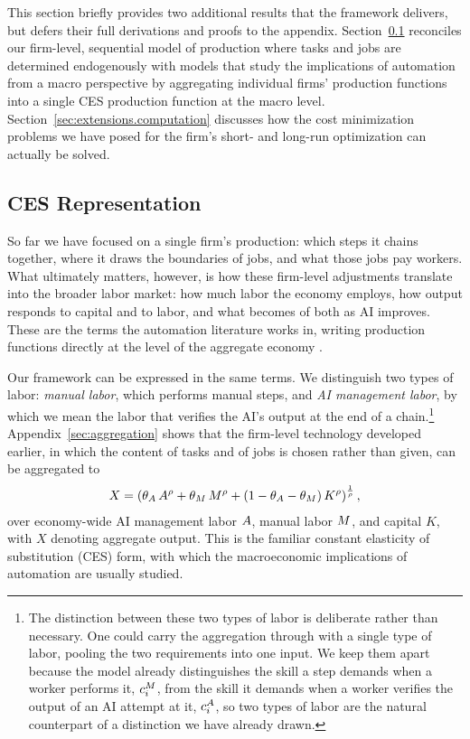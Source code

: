 This section briefly provides two additional results that the framework delivers, but defers their full derivations and proofs to the appendix.
Section~\ref{sec:extensions.aggregation} reconciles our firm-level, sequential model of production where tasks and jobs are determined endogenously with models that study the implications of automation from a macro perspective by aggregating individual firms' production functions into a single CES production function at the macro level.
Section~\ref{sec:extensions.computation} discusses how the cost minimization problems we have posed for the firm's short- and long-run optimization can actually be solved.


\subsection{CES Representation}
\label{sec:extensions.aggregation}

So far we have focused on a single firm's production: which steps it chains together, where it draws the boundaries of jobs, and what those jobs pay workers.
What ultimately matters, however, is how these firm-level adjustments translate into the broader labor market: how much labor the economy employs, how output responds to capital and to labor, and what becomes of both as AI improves.
These are the terms the automation literature works in, writing production functions directly at the level of the aggregate economy \citep{acemoglu2018, acemoglu2022artificial, acemoglu2024tasks}.

Our framework can be expressed in the same terms.
We distinguish two types of labor: \emph{manual labor}, which performs manual steps, and \emph{AI management labor}, by which we mean the labor that verifies the AI's output at the end of a chain.\footnote{
The distinction between these two types of labor is deliberate rather than necessary.
One could carry the aggregation through with a single type of labor, pooling the two requirements into one input.
We keep them apart because the model already distinguishes the skill a step demands when a worker performs it, $c^{M}_{i}$, from the skill it demands when a worker verifies the output of an AI attempt at it, $c^{A}_{i}$, so two types of labor are the natural counterpart of a distinction we have already drawn.
}
Appendix~\ref{sec:aggregation} shows that the firm-level technology developed earlier, in which the content of tasks and of jobs is chosen rather than given, can be aggregated to
\begin{align}
\label{eq:lr_macro_ces}
X = \left(\theta_{A}\,A^{\rho} + \theta_{M}\,M^{\rho} + (1-\theta_{A}-\theta_{M})\,K^{\rho}\right)^{\frac{1}{\rho}},
\end{align}
over economy-wide AI management labor $A$, manual labor $M$, and capital $K$, with $X$ denoting aggregate output.
This is the familiar constant elasticity of substitution (CES) form, with which the macroeconomic implications of automation are usually studied.

